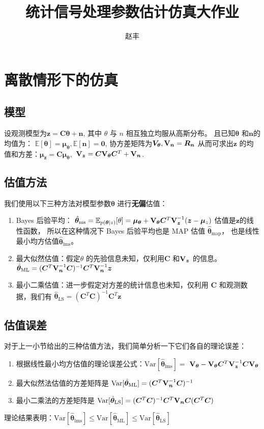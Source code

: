 \documentclass{ctexart}
\def\E{\mathbb{E}}
\def\Var{\textrm{Var}}
\begin{document}
\title{统计信号处理参数估计仿真大作业}
\author{赵丰}
\maketitle
\section{离散情形下的仿真}
\subsection{模型}
设观测模型为$\bm{z} = \bm{C} \bm{\theta} + \bm{n}$, 其中 $\theta$ 与 $n$ 相互独立均服从高斯分布。
且已知$\bm{\theta}$ 和$\bm{n}$的均值为： $\E[\bm{\theta}] = \bm{\mu}_{\bm{\theta}}, \E[\bm{n}] = \bm{0}$,
协方差矩阵为$\bm{V}_{\bm{\theta}}, \Cov[\bm{n}]=\bm{R}_{\bm{n}}$
从而可求出$\bm{z}$ 的均值和方差：$\bm{\mu}_{\bm{z}} = \bm{C}\bm{\mu}_{\bm{\theta}},$
$\Cov[\bm{z}] = \bm{C}\Cov[\bm{\theta}]\bm{C}^T + \Cov[\bm{n}]$.
\subsection{估值方法}
我们使用以下三种方法对模型参数$\bm{\theta}$ 进行\textbf{无偏}估值：
\begin{enumerate}
    \item Bayes 后验平均：
    $\hat{\bm{\theta}}_{\textrm{ms}} = 
    \E_{p(\bm{\theta}|z)}[\theta] 
    = \bm{\mu}_{\bm{\theta}} + \Cov[\bm{\theta}] \bm{C}^T \Cov[\bm{z}]^{-1}(\bm{z} - \bm{\mu}_z)$
    估值是$\bm{z}$的线性函数， 所以在这种情况下 Bayes 后验平均也是 MAP 估值 $\hat{\bm{\theta}}_{\textrm{map}}$，
    也是线性最小均方估值$\hat{\bm{\theta}}_{\textrm{lms}}$。
    \item 最大似然估值：假定$\theta$ 的先验信息未知，仅利用$\bm{C}$ 和$\Cov[\bm{z}]$ 的信息。
    $ \hat{\bm{\theta}}_{\textrm{ML}} = (\bm{C}^T \Cov[\bm{n}]^{-1} \bm{C})^{-1} \bm{C}^T \Cov[\bm{n}]^{-1} \bm{z}$
    \item 最小二乘估值：进一步假定对方差的统计信息也未知，仅利用 $\bm{C}$ 和观测数据，我们有
    $ \hat{\bm{\theta}}_{\textrm{LS}} = (\bm{C}^T \bm{C})^{-1} \bm{C}^T \bm{z} $    
\end{enumerate}
\subsection{估值误差}
对于上一小节给出的三种估值方法，我们简单分析一下它们各自的理论误差：
\begin{enumerate}
    \item 根据线性最小均方估值的理论误差公式：$ \Var[\hat{\bm{\theta}}_{\textrm{lms}}] = $
    $\Cov[\bm{\theta}] - \Cov[\bm{\theta}]\bm{C}^T \Cov[\bm{z}]^{-1} \bm{C}\Cov[\bm{\theta}]$
    \item 最大似然法估值的方差矩阵是 $\Var[\hat{\bm{\theta}}_{\textrm{ML}}] = (\bm{C}^T \Cov[\bm{n}]^{-1}\bm{C})^{-1}$
    \item 最小二乘法的方差矩阵是 $\Var[\hat{\bm{\theta}}_{\textrm{LS}}] = (\bm{C}^T\bm{C})^{-1} \bm{C}^T \Cov[\bm{n}]
    \bm{C}(\bm{C}^T\bm{C})$
\end{enumerate}
理论结果表明：$ \Var[\hat{\bm{\theta}}_{\textrm{lms}}] \leq \Var[\hat{\bm{\theta}}_{\textrm{ML}}] \leq \Var[\hat{\bm{\theta}}_{\textrm{LS}}]$
\end{document}
